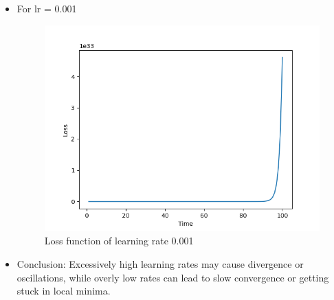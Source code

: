 \documentclass[12pt]{article}
\begin{document}
\begin{itemize}
\newpage
    \item For lr = 0.001
        \begin{figure}[h!]
            \centering
            \includegraphics[width=0.7\linewidth]{images/Lab2/Big.png}
            \caption{Loss function of learning rate 0.001}
        \end{figure}

    \item Conclusion: Excessively high learning rates may cause divergence or oscillations, while overly low rates can lead to slow convergence or getting stuck in local minima.

\end{itemize}


\end{document}
